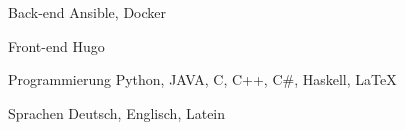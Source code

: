 


\begin{cvskills}

    \cvskill
      {Back-end}
      {Ansible, Docker}

    \cvskill
      {Front-end} %
      {Hugo} %

    \cvskill
      {Programmierung} %
      {Python, JAVA, C, C++, C\#, Haskell, \LaTeX} %

    \cvskill
      {Sprachen} %
      {Deutsch, Englisch, Latein} %

\end{cvskills}
